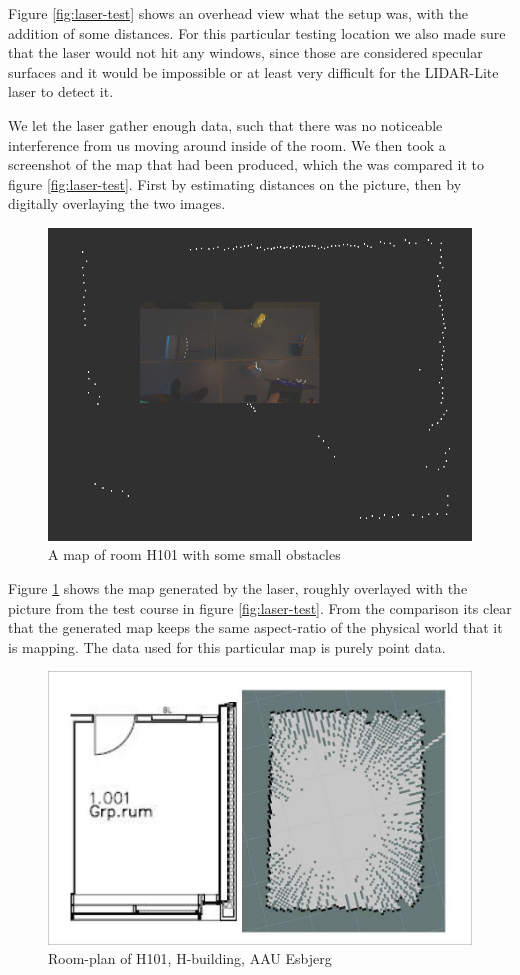 Figure \ref{fig:laser-test} shows an overhead view what the setup was, with the addition of some distances. For this particular testing location we also made sure that the laser would not hit any windows, since those are considered specular surfaces and it would be impossible or at least very difficult for the LIDAR-Lite laser to detect it.

We let the laser gather enough data, such that there was no noticeable interference from us moving around inside of the room. We then took a screenshot of the map that had been produced, which the was compared it to figure \ref{fig:laser-test}. First by estimating distances on the picture, then by digitally overlaying the two images.

\begin{figure}[H]
	\centering
	\includegraphics[scale=.4]{images/h101_obstacles_overlay.png}
	\caption{A map of room H101 with some small obstacles}
	\label{fig:laser-compare}
\end{figure}
	
Figure \ref{fig:laser-compare} shows the map generated by the laser, roughly overlayed with the picture from the test course in figure \ref{fig:laser-test}. From the comparison its clear that the generated map keeps the same aspect-ratio of the physical world that it is mapping. The data used for this particular map is purely point data.

\begin{figure}[H]
	\centering
	\includegraphics[width=.5\linewidth]{images/compare.jpg}
	\caption{Room-plan of H101, H-building, AAU Esbjerg}
	\label{fig:h101hector}
\end{figure}

